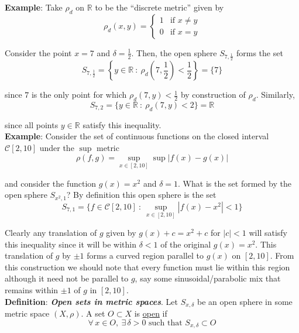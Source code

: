 \documentclass[12pt]{article}
\newlength\tindent
\renewcommand{\indent}{\hspace*{\tindent}}
\newcommand{\R}{\mathbb R}
\begin{document}
%
%
{\bf Example}: Take $\rho_d$ on $\R$ to be the ``discrete metric'' given by
\begin{equation*}
	\rho_d(x, y) = 
	\begin{cases} 
		1 & \text{if $x \neq y$} \\
		0 & \text{if $x = y$}
	\end{cases}
\end{equation*}

Consider the point $x = 7$ and $\delta = \frac{1}{2}$. Then, the open sphere $S_{7,\frac{1}{2}}$ forms the set
\begin{equation*}
	S_{7,\frac{1}{2}} = \left\{y \in \R ~:~ \rho_d\left(7, \frac{1}{2}\right) < \frac{1}{2} \right\} = \{7\}
\end{equation*}

since $7$ is the only point for which $\rho_d\left(7, y\right) < \frac{1}{2}$ by construction of $\rho_d$. Similarly,
\begin{equation*}
	S_{7, 2} = \{ y \in \R ~:~ \rho_d(7, y) < 2 \} = \R
\end{equation*}

since all points $y \in \R$ satisfy this inequality. \\

%
%
{\bf Example}: Consider the set of continuous functions on the closed interval $\mathcal C[2,10]$ under the $\sup$ metric
\begin{equation*}
	\rho(f,g) = \sup_{x\in[2,10]} \sup |f(x) - g(x)|
\end{equation*}

and consider the function $g(x) = x^2$ and $\delta = 1$. What is the set formed by the open sphere $S_{x^2, 1}$? By definition this open sphere is the set
\begin{equation*}
	S_{7,1} = \{ f \in \mathcal C[2,10] ~:~ \sup_{x\in[2,10]} |f(x) - x^2| < 1\}
\end{equation*}

\indent Clearly any translation of $g$ given by $g(x) + c = x^2 + c$ for $|c| < 1$ will satisfy this inequality since it will be within $\delta < 1$ of the original $g(x) = x^2$. This translation of $g$ by $\pm 1$ forms a curved region parallel to $g(x)$ on $[2,10]$. From this construction we should note that every function must lie within this region although it need not be parallel to $g$, say some sinusoidal/parabolic mix that remains within $\pm 1$ of $g$ in $[2, 10]$. \\

%
%
{\bf Definition}: {\bf \em Open sets in metric spaces}. Let $S_{x, \delta}$ be an open sphere in some metric space $(X, \rho)$. A set $O \subset X$ is \underline{open} if
\begin{equation*}
	\forall\,x\in O,~\exists\,\delta > 0 \text{ such that } S_{x,\delta} \subset O
\end{equation*}
\end{document}
